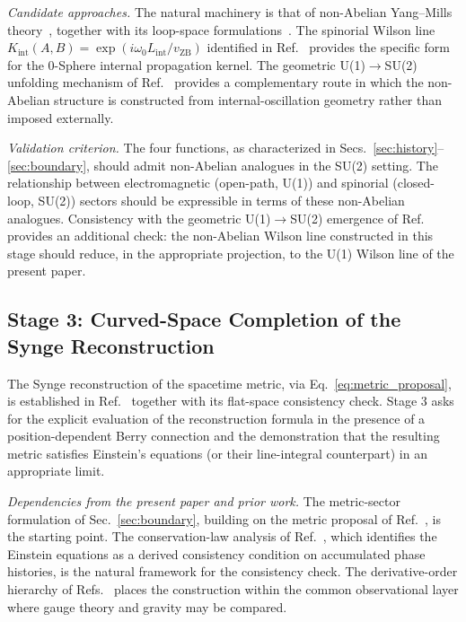 \documentclass[%
 reprint, amsmath,amssymb, aps, prb, ]{revtex4-2}
\numberwithin{equation}{section}
\newcommand{\vZB}{v_{\mathrm{ZB}}}
\begin{document}
\textit{Candidate approaches.} The natural machinery is that of non-Abelian Yang--Mills theory~\cite{YangMills1954}, together with its loop-space formulations~\cite{MigdalMakeenko1979}. The spinorial Wilson line $K_{\text{int}}(A, B) = \exp(i\omega_0 L_{\text{int}}/\vZB)$ identified in Ref.~\cite{hanamura45} provides the specific form for the 0-Sphere internal propagation kernel. The geometric U(1)$\to$SU(2) unfolding mechanism of Ref.~\cite{hanamura19} provides a complementary route in which the non-Abelian structure is constructed from internal-oscillation geometry rather than imposed externally.

\textit{Validation criterion.} The four functions, as characterized in Secs.~\ref{sec:history}--\ref{sec:boundary}, should admit non-Abelian analogues in the SU(2) setting. The relationship between electromagnetic (open-path, U(1)) and spinorial (closed-loop, SU(2)) sectors should be expressible in terms of these non-Abelian analogues. Consistency with the geometric U(1)$\to$SU(2) emergence of Ref.~\cite{hanamura19} provides an additional check: the non-Abelian Wilson line constructed in this stage should reduce, in the appropriate projection, to the U(1) Wilson line of the present paper.

\subsection{Stage 3: Curved-Space Completion of the Synge Reconstruction}
\label{app:stage3}

The Synge reconstruction of the spacetime metric, via Eq.~\eqref{eq:metric_proposal}, is established in Ref.~\cite{hanamura51} together with its flat-space consistency check. Stage 3 asks for the explicit evaluation of the reconstruction formula in the presence of a position-dependent Berry connection and the demonstration that the resulting metric satisfies Einstein's equations (or their line-integral counterpart) in an appropriate limit.

\textit{Dependencies from the present paper and prior work.} The metric-sector formulation of Sec.~\ref{sec:boundary}, building on the metric proposal of Ref.~\cite{hanamura51}, is the starting point. The conservation-law analysis of Ref.~\cite{hanamura30}, which identifies the Einstein equations as a derived consistency condition on accumulated phase histories, is the natural framework for the consistency check. The derivative-order hierarchy of Refs.~\cite{hanamura40, hanamura41} places the construction within the common observational layer where gauge theory and gravity may be compared.
\end{document}
